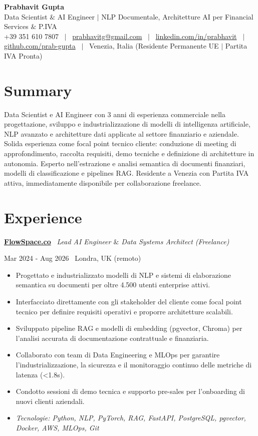 \documentclass[a4paper,10pt]{article}
\newcommand{\role}[4]{%
  \vspace{2pt}\noindent
  \begin{minipage}[t]{0.70\textwidth}\raggedright\textbf{#1} \textbullet\ \textit{#3}\end{minipage}%
  \hfill
  \begin{minipage}[t]{0.28\textwidth}\raggedleft\footnotesize\color{gray}#2 \textbullet\ #4\end{minipage}%
  \vspace{1pt}%
}
\begin{document}
\begin{minipage}[c]{0.80\textwidth}
  {\Huge\bfseries Prabhavit Gupta}\\[3pt]
  {\color{accent}\large Data Scientist $\&$ AI Engineer $\vert$ NLP Documentale, Architetture AI per Financial Services $\&$ P.IVA}\\[6pt]
  {\footnotesize +39 351 610 7807 ~$\vert$~
  \href{mailto:prabhavitg@gmail.com}{prabhavitg@gmail.com} ~$\vert$~
  \href{https://www.linkedin.com/in/prabhavit/}{linkedin.com/in/prabhavit} ~$\vert$~
  \href{https://github.com/prab-gupta}{github.com/prab-gupta} ~$\vert$~
  Venezia, Italia (Residente Permanente UE $\vert$ Partita IVA Pronta)}
\end{minipage}\hfill

\section{Summary}
Data Scientist e AI Engineer con 3 anni di esperienza commerciale nella progettazione, sviluppo e industrializzazione di modelli di intelligenza artificiale, NLP avanzato e architetture dati applicate al settore finanziario e aziendale. Solida esperienza come focal point tecnico cliente: conduzione di meeting di approfondimento, raccolta requisiti, demo tecniche e definizione di architetture in autonomia. Esperto nell'estrazione e analisi semantica di documenti finanziari, modelli di classificazione e pipelines RAG. Residente a Venezia con Partita IVA attiva, immediatamente disponibile per collaborazione freelance.

\section{Experience}

\role{\href{https://flowspace.co}{FlowSpace.co}}{Mar 2024 - Aug 2026}{Lead AI Engineer $\&$ Data Systems Architect (Freelance)}{Londra, UK (remoto)}
\begin{itemize}
  \item Progettato e industrializzato modelli di NLP e sistemi di elaborazione semantica su documenti per oltre 4.500 utenti enterprise attivi.
  \item Interfacciato direttamente con gli stakeholder del cliente come focal point tecnico per definire requisiti operativi e proporre architetture scalabili.
  \item Sviluppato pipeline RAG e modelli di embedding (pgvector, Chroma) per l'analisi accurata di documentazione contrattuale e finanziaria.
  \item Collaborato con team di Data Engineering e MLOps per garantire l'industrializzazione, la sicurezza e il monitoraggio continuo delle metriche di latenza (<1.8s).
  \item Condotto sessioni di demo tecnica e supporto pre-sales per l'onboarding di nuovi clienti aziendali.
  \item \textit{Tecnologie: Python, NLP, PyTorch, RAG, FastAPI, PostgreSQL, pgvector, Docker, AWS, MLOps, Git}
\end{itemize}
\end{document}
